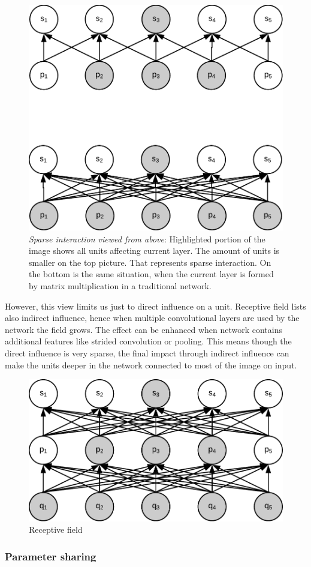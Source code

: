 \begin{figure}[ht]
    \centering
    \includegraphics[width=.6\textwidth]{obrazky-figures/sparse_a.pdf}
    \caption{\textit{Sparse interaction viewed from above}: Highlighted portion of the image shows all units affecting current layer. The amount of units is smaller on the top picture. That represents sparse interaction. On the bottom is the same situation, when the current layer is formed by matrix multiplication in a traditional network.}\label{fig:sparse_a}
\end{figure}

However, this view limits us just to direct influence on a unit. Receptive field lists also indirect influence, hence when multiple convolutional layers are used by the network the field grows. The effect can be enhanced when network contains additional features like strided convolution or pooling. This means though the direct influence is very sparse, the final impact through indirect influence can make the units deeper in the network connected to most of the image on input.

\begin{figure}[ht]
    \centering
    \includegraphics[width=.6\textwidth]{obrazky-figures/receptive.pdf}
    \caption{Receptive field}\label{fig:receptive}
\end{figure}

\subsubsection{Parameter sharing}

